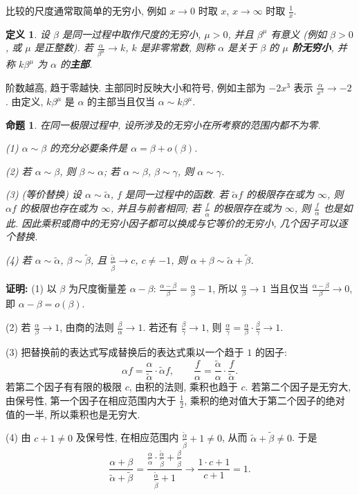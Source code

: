 \documentclass[UTF8,openany]{ctexbook}
\theoremstyle{chinesetextbook}
\newtheorem{definition}{定义}[section]
\newtheorem{proposition}{命题}[section]
\newenvironment{cnproof}{\par\indent\textbf{证明:} \ignorespaces}{\par}
\begin{document}
比较的尺度通常取简单的无穷小, 例如 $x\to0$ 时取 $x$, $x\to\infty$ 时取 $\displaystyle\frac1x$.
\begin{definition}
设 $\beta$ 是同一过程中取作尺度的无穷小, $\mu>0$, 并且 $\beta^\mu$ 有意义 (例如 $\beta>0$, 或 $\mu$ 是正整数). 若 $\displaystyle\frac\alpha{\beta^\mu}\to k$, $k$ 是非零常数, 则称 $\alpha$ 是关于 $\beta$ 的 \textbf{$\mu$ 阶无穷小}, 并称 $k\beta^\mu$ 为 $\alpha$ 的\textbf{主部}.
\end{definition}
阶数越高, 趋于零越快. 主部同时反映大小和符号, 例如主部为 $-2x^3$ 表示 $\displaystyle\frac\alpha{x^3}\to-2$. 由定义, $k\beta^\mu$ 是 $\alpha$ 的主部当且仅当 $\alpha\sim k\beta^\mu$.
\begin{proposition}
在同一极限过程中, 设所涉及的无穷小在所考察的范围内都不为零.

\textup{(1)} $\alpha\sim\beta$ 的充分必要条件是 $\alpha=\beta+o(\beta)$.

\textup{(2)} 若 $\alpha\sim\beta$, 则 $\beta\sim\alpha$; 若 $\alpha\sim\beta$, $\beta\sim\gamma$, 则 $\alpha\sim\gamma$.

\textup{(3)} (等价替换) 设 $\alpha\sim\widetilde\alpha$, $f$ 是同一过程中的函数. 若 $\widetilde\alpha f$ 的极限存在或为 $\infty$, 则 $\alpha f$ 的极限也存在或为 $\infty$, 并且与前者相同; 若 $\displaystyle\frac f{\widetilde\alpha}$ 的极限存在或为 $\infty$, 则 $\displaystyle\frac f\alpha$ 也是如此. 因此乘积或商中的无穷小因子都可以换成与它等价的无穷小, 几个因子可以逐个替换.

\textup{(4)} 若 $\alpha\sim\widetilde\alpha$, $\beta\sim\widetilde\beta$, 且 $\displaystyle\frac{\widetilde\alpha}{\widetilde\beta}\to c$, $c\ne-1$, 则 $\alpha+\beta\sim\widetilde\alpha+\widetilde\beta$.
\end{proposition}
\begin{cnproof}
(1) 以 $\beta$ 为尺度衡量差 $\alpha-\beta$: $\displaystyle\frac{\alpha-\beta}\beta=\frac\alpha\beta-1$, 所以 $\displaystyle\frac\alpha\beta\to1$ 当且仅当 $\displaystyle\frac{\alpha-\beta}\beta\to0$, 即 $\alpha-\beta=o(\beta)$.

(2) 若 $\displaystyle\frac\alpha\beta\to1$, 由商的法则 $\displaystyle\frac\beta\alpha\to1$. 若还有 $\displaystyle\frac\beta\gamma\to1$, 则 $\displaystyle\frac\alpha\gamma=\frac\alpha\beta\cdot\frac\beta\gamma\to1$.

(3) 把替换前的表达式写成替换后的表达式乘以一个趋于 $1$ 的因子:
\[
\alpha f=\frac\alpha{\widetilde\alpha}\cdot\widetilde\alpha f,\qquad\frac f\alpha=\frac{\widetilde\alpha}\alpha\cdot\frac f{\widetilde\alpha}.
\]
若第二个因子有有限的极限 $c$, 由积的法则, 乘积也趋于 $c$. 若第二个因子是无穷大, 由保号性, 第一个因子在相应范围内大于 $\displaystyle\frac12$, 乘积的绝对值大于第二个因子的绝对值的一半, 所以乘积也是无穷大.

(4) 由 $c+1\ne0$ 及保号性, 在相应范围内 $\displaystyle\frac{\widetilde\alpha}{\widetilde\beta}+1\ne0$, 从而 $\widetilde\alpha+\widetilde\beta\ne0$. 于是
\[
\frac{\alpha+\beta}{\widetilde\alpha+\widetilde\beta}=\frac{\frac\alpha{\widetilde\alpha}\cdot\frac{\widetilde\alpha}{\widetilde\beta}+\frac\beta{\widetilde\beta}}{\frac{\widetilde\alpha}{\widetilde\beta}+1}\to\frac{1\cdot c+1}{c+1}=1.
\]
\end{cnproof}
\end{document}
